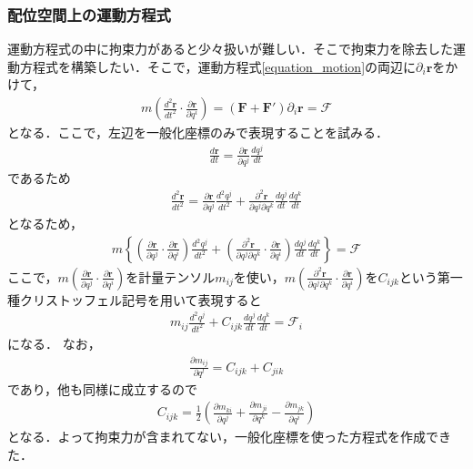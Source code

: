 \documentclass[../Main.tex]{subfiles}
\begin{document}
\subsubsection{配位空間上の運動方程式}
運動方程式の中に拘束力があると少々扱いが難しい．そこで拘束力を除去した運動方程式を構築したい．そこで，運動方程式\eqref{equation_motion}の両辺に$\partial_i\bm{r}$をかけて，
\begin{eqnarray}
  m\left( \frac{d^2\bm{r}}{dt^2} \cdot \frac{\partial \bm{r}}{\partial q^i} \right) = \left( \bm{F} + \bm{F}' \right)\partial_i\bm{r} = \mathcal{F}
\end{eqnarray}
となる．ここで，左辺を一般化座標のみで表現することを試みる．
\begin{eqnarray}
  \frac{d \bm{r}}{dt} = \frac{\partial \bm{r}}{\partial q^j} \frac{d q^j}{dt}
\end{eqnarray}
であるため
\begin{eqnarray}
  \frac{d^2\bm{r}}{dt^2} = \frac{\partial \bm{r}}{\partial q^j} \frac{d^2 q^j}{dt^2} + \frac{\partial^2 \bm{r}}{\partial q^j \partial q^k}\frac{d q^j}{dt}\frac{d q^k}{dt}
\end{eqnarray}
となるため，
\begin{eqnarray}
  m \left\{ \left(\frac{\partial \bm{r}}{\partial q^j}\cdot  \frac{\partial \bm{r}}{\partial q^i} \right)\frac{d^2 q^j}{dt^2} + \left(\frac{\partial^2 \bm{r}}{\partial q^j \partial q^k}\cdot \frac{\partial \bm{r}}{\partial q^i} \right)\frac{d q^j}{dt}\frac{d q^k}{dt} \right\} = \mathcal{F}
\end{eqnarray}
ここで，$m\left(\frac{\partial \bm{r}}{\partial q^j}\cdot  \frac{\partial \bm{r}}{\partial q^i} \right)$を計量テンソル$m_{ij}$を使い，$ m\left(\frac{\partial^2 \bm{r}}{\partial q^j \partial q^k}\cdot \frac{\partial \bm{r}}{\partial q^i} \right)$を$C_{ijk}$という第一種クリストッフェル記号を用いて表現すると
\begin{eqnarray}
  m_{ij}\frac{d^2 q^j}{dt^2} + C_{ijk}\frac{d q^j}{dt}\frac{d q^k}{dt}  = \mathcal{F}_i
\end{eqnarray}
になる．
なお，
\begin{eqnarray}
  \frac{\partial m_{ij}}{\partial q^{l}} = C_{ijk} + C_{jik}
\end{eqnarray}
であり，他も同様に成立するので
\begin{eqnarray}
  C_{ijk} = \frac{1}{2}\left( \frac{\partial m_{ki}}{\partial q^j} + \frac{\partial m_{ji}}{\partial q^k} - \frac{\partial m_{jk}}{\partial q^i} \right)
\end{eqnarray}
となる．よって拘束力が含まれてない，一般化座標を使った方程式を作成できた．
\end{document}
